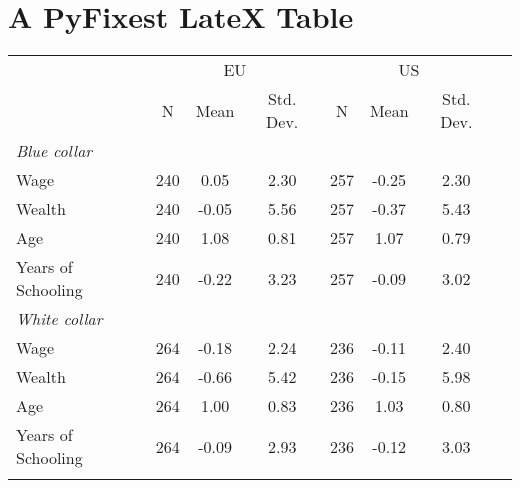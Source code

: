 \documentclass{article}%
\begin{document}
%
\normalsize%
\section{A PyFixest LateX Table}%
\label{sec:APyFixestLateXTable}%


\begin{table}[htbp]%
\renewcommand\cellalign{t}
\begin{threeparttable}
\begin{tabular}{lccccccc}
\toprule
 & \multicolumn{3}{c}{EU} & \multicolumn{3}{c}{US} \\
\cmidrule(lr){2-4} \cmidrule(lr){5-7}
 & N & Mean & Std. Dev. & N & Mean & Std. Dev. \\
\midrule
\addlinespace
\emph{Blue collar} \\
\addlinespace
Wage & 240 & 0.05 & 2.30 & 257 & -0.25 & 2.30 \\
Wealth & 240 & -0.05 & 5.56 & 257 & -0.37 & 5.43 \\
Age & 240 & 1.08 & 0.81 & 257 & 1.07 & 0.79 \\
Years of Schooling & 240 & -0.22 & 3.23 & 257 & -0.09 & 3.02 \\
\addlinespace
\midrule
\addlinespace
\emph{White collar} \\
\addlinespace
Wage & 264 & -0.18 & 2.24 & 236 & -0.11 & 2.40 \\
Wealth & 264 & -0.66 & 5.42 & 236 & -0.15 & 5.98 \\
Age & 264 & 1.00 & 0.83 & 236 & 1.03 & 0.80 \\
Years of Schooling & 264 & -0.09 & 2.93 & 236 & -0.12 & 3.03 \\
\addlinespace
\bottomrule
\end{tabular}
\footnotesize
\end{threeparttable}%
\end{table}

%
\end{document}
